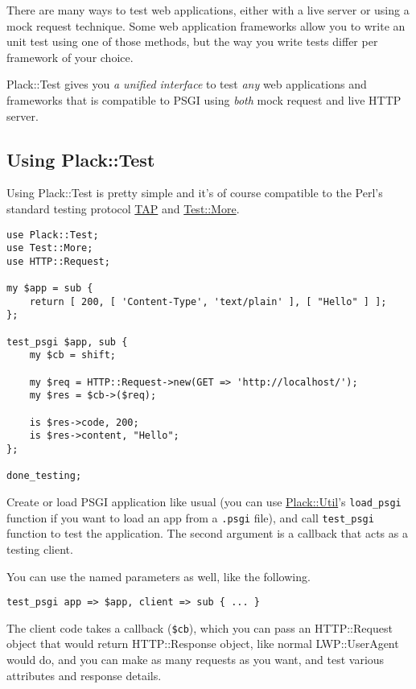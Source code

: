 There are many ways to test web applications, either with a live server
or using a mock request technique. Some web application frameworks allow
you to write an unit test using one of those methods, but the way you
write tests differ per framework of your choice.

Plack::Test gives you \emph{a unified interface} to test \emph{any} web
applications and frameworks that is compatible to PSGI using \emph{both}
mock request and live HTTP server.

\subsection{Using Plack::Test}\label{using-placktest}

Using Plack::Test is pretty simple and it's of course compatible to the
Perl's standard testing protocol
\href{http://testanything.org/wiki/}{TAP} and
\href{http://search.cpan.org/perldoc?Test::More}{Test::More}.

\begin{lstlisting}
use Plack::Test;
use Test::More;
use HTTP::Request;

my $app = sub {
    return [ 200, [ 'Content-Type', 'text/plain' ], [ "Hello" ] ];
};

test_psgi $app, sub {
    my $cb = shift;
    
    my $req = HTTP::Request->new(GET => 'http://localhost/');
    my $res = $cb->($req);
    
    is $res->code, 200;
    is $res->content, "Hello";
};

done_testing;
\end{lstlisting}

Create or load PSGI application like usual (you can use
\href{http://search.cpan.org/perldoc?Plack::Util}{Plack::Util}'s
\lstinline!load_psgi! function if you want to load an app from a
\lstinline!.psgi! file), and call \lstinline!test_psgi! function to test
the application. The second argument is a callback that acts as a
testing client.

You can use the named parameters as well, like the following.

\begin{lstlisting}
test_psgi app => $app, client => sub { ... }
\end{lstlisting}

The client code takes a callback (\lstinline!$cb!), which you can pass
an HTTP::Request object that would return HTTP::Response object, like
normal LWP::UserAgent would do, and you can make as many requests as you
want, and test various attributes and response details.


